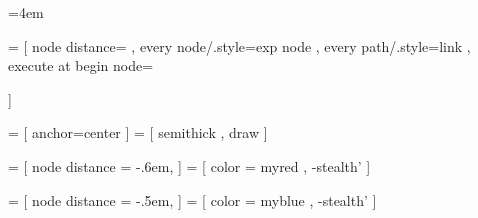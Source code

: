 
\newdimen\nodedistance
\nodedistance=4em

  = [ node distance=\nodedistance
    , every node/.style={exp node}
    , every path/.style={link}
    , execute at begin node={\strut}
    ]

  = [ anchor=center
    ]
  = [ semithick
    , draw
    ]

  = [ node distance = -.6em,
    ]
  = [ color = myred
    , -stealth'
    ]

  = [ node distance = -.5em,
    ]
  = [ color = myblue
    , -stealth'
    ]

%



\newcommand{\coord}[1]{\tikz[remember picture] \coordinate (#1);}

\newcommand{\distanceTop}{7.15pt}

\newcommand{\distanceBottom}{-2.55pt}

\newcommand{\distanceLeft}{-0.5pt}

\newcommand{\distanceRight}{0.5pt}


%
\newcommand{\drawrect}[4][]{\begin{tikzpicture}[remember picture, overlay]
\draw[layout box, #1]
  ($(#2) +(\distanceLeft, \distanceTop) + (-#4, #4)$) rectangle
  ($(#3) + (\distanceRight, \distanceBottom) + (#4, -#4)$);
\end{tikzpicture}}

%
\newcommand{\drawbox}[5][]{\begin{tikzpicture}[remember picture, overlay]
\draw[layout box, #1]
  ($(#2) + (\distanceLeft, \distanceTop) + (-#5, #5)$) --
  ($(#4 |- #2) + (\distanceRight, \distanceTop) + (#5, #5)$) --
  ($(#4) + (\distanceRight, \distanceBottom) + (#5, -#5)$) --
  ($(#3 |- #4) + (\distanceLeft, \distanceBottom) + (-#5, -#5)$) --
  ($(#3 |- #2) + (\distanceLeft, \distanceBottom) + (-#5, -#5)$) --
  ($(#2) + (\distanceLeft, \distanceBottom) + (-#5, -#5)$) --
  cycle;
\end{tikzpicture}}

